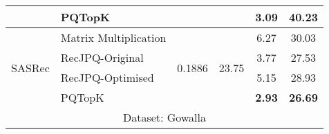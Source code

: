 \begin{tabular}{llcccc}
\multicolumn{1}{l|}{}                                                         & \multicolumn{1}{l|}{PQTopK}                                                             &                                                    &                                                             & \textbf{3.09}                                           & \textbf{40.23}                                        \\ \hline
\multicolumn{1}{l|}{\multirow{4}{*}{SASRec}}                                  & \multicolumn{1}{l|}{Matrix Multiplication}                                               & \multirow{4}{*}{0.1886}                            & \multirow{4}{*}{23.75}                                      & 6.27                                                    & 30.03                                                 \\
\multicolumn{1}{l|}{}                                                         & \multicolumn{1}{l|}{RecJPQ-Original}                                                     &                                                    &                                                             & 3.77                                                    & 27.53                                                 \\
\multicolumn{1}{l|}{}                                                         & \multicolumn{1}{l|}{RecJPQ-Optimised}                                                    &                                                    &                                                             & 5.15                                                    & 28.93                                                 \\
\multicolumn{1}{l|}{}                                                         & \multicolumn{1}{l|}{PQTopK}                                                             &                                                    &                                                             & \textbf{2.93}                                           & \textbf{26.69}                                        \\ \hline
\multicolumn{6}{c}{Dataset: Gowalla}                                                                                                                                                                                                                                                                                                                                                                          \\ \hline

\end{tabular}
